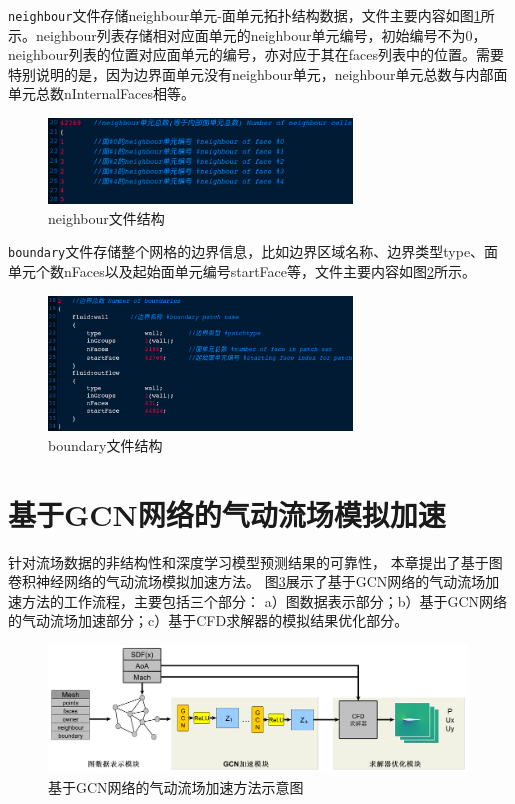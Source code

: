 \texttt{neighbour}文件存储neighbour单元-面单元拓扑结构数据，文件主要内容如图\ref{fig:neighbour_file}所示。neighbour列表存储相对应面单元的neighbour单元编号，初始编号不为0，neighbour列表的位置对应面单元的编号，亦对应于其在faces列表中的位置。需要特别说明的是，因为边界面单元没有neighbour单元，neighbour单元总数与内部面单元总数nInternalFaces相等。

\begin{figure}[htp]
	\centering
	\includegraphics[width=0.72\textwidth]{./figures/neighbour.png}
	\caption{neighbour文件结构}
	\label{fig:neighbour_file}	
\end{figure}

\texttt{boundary}文件存储整个网格的边界信息，比如边界区域名称、边界类型type、面单元个数nFaces以及起始面单元编号startFace等，文件主要内容如图\ref{fig:boundary_file}所示。

\begin{figure}[htp]
	\centering
	\includegraphics[width=0.72\textwidth]{./figures/boundary.png}
	\caption{boundary文件结构}
	\label{fig:boundary_file}	
\end{figure}




\section{基于GCN网络的气动流场模拟加速}

针对流场数据的非结构性和深度学习模型预测结果的可靠性，
本章提出了基于图卷积神经网络的气动流场模拟加速方法。
图\ref{fig:gcnflow}展示了基于GCN网络的气动流场加速方法的工作流程，主要包括三个部分：
a）图数据表示部分；b）基于GCN网络的气动流场加速部分；c）基于CFD求解器的模拟结果优化部分。

\begin{figure}[htp]
	\centering
	\includegraphics[width=0.99\textwidth]{figures/data/architecture2.pdf}
	\caption{基于GCN网络的气动流场加速方法示意图}
	\label{fig:gcnflow}
\end{figure}


